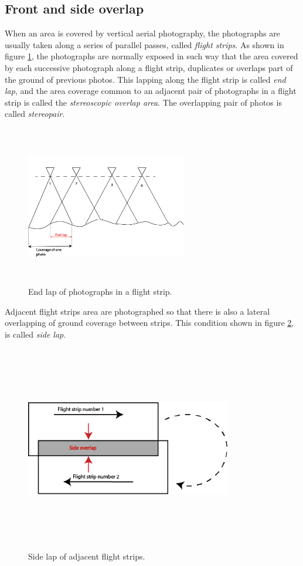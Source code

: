 \subsection{Front and side overlap}
When an area is covered by vertical aerial photography, the photographs are usually taken along a series of parallel passes, called \textit{flight strips}. As shown in figure \ref{fig:EndLap}, the photographs are normally exposed in such way that the area covered by each successive photograph along a flight strip, duplicates or overlaps part of the ground of previous photos. This lapping along the flight strip is called \textit{end lap}, and the area coverage common to an adjacent pair of photographs in a flight strip is called the \textit{stereoscopic overlap area}. The overlapping pair of photos is called \textit{stereopair}.\cite{elements_photogrammetry} \cite{Sergio}
\begin{figure}[H]
\centering
\includegraphics[width=7cm,height=7cm,keepaspectratio]{imagenes/End_Lap.png}
\caption{End lap of photographs in a flight strip.}
\label{fig:EndLap}
\end{figure}
Adjacent flight strips area  are photographed so that there is also a lateral overlapping of ground coverage between strips. This condition shown in figure \ref{fig:SideLap}, is called \textit{side lap}.\cite{elements_photogrammetry}
\begin{figure}[H]
\centering
\includegraphics[width=9cm,height=9cm,keepaspectratio]{imagenes/Side_overlap.png}
\caption{Side lap of adjacent flight strips.}
\label{fig:SideLap}
\end{figure}

